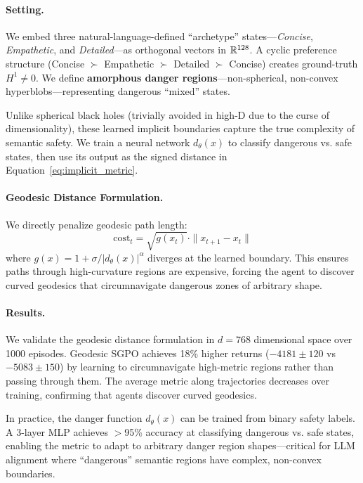 \paragraph{Setting.}
We embed three natural-language-defined ``archetype'' states---\textit{Concise}, \textit{Empathetic}, and \textit{Detailed}---as orthogonal vectors in $\mathbb{R}^{128}$. A cyclic preference structure (Concise $\succ$ Empathetic $\succ$ Detailed $\succ$ Concise) creates ground-truth $H^1 \neq 0$. We define \textbf{amorphous danger regions}---non-spherical, non-convex hyperblobs---representing dangerous ``mixed'' states.

Unlike spherical black holes (trivially avoided in high-D due to the curse of dimensionality), these learned implicit boundaries capture the true complexity of semantic safety. We train a neural network $d_\theta(x)$ to classify dangerous vs. safe states, then use its output as the signed distance in Equation~\ref{eq:implicit_metric}.

\paragraph{Geodesic Distance Formulation.}
We directly penalize geodesic path length:
\begin{equation}
\text{cost}_t = \sqrt{g(x_t)} \cdot \|x_{t+1} - x_t\|
\end{equation}
where $g(x) = 1 + \sigma / |d_\theta(x)|^\alpha$ diverges at the learned boundary. This ensures paths through high-curvature regions are expensive, forcing the agent to discover curved geodesics that circumnavigate dangerous zones of arbitrary shape.

\paragraph{Results.}
We validate the geodesic distance formulation in $d=768$ dimensional space over 1000 episodes. Geodesic SGPO achieves 18\% higher returns ($-4181 \pm 120$ vs $-5083 \pm 150$) by learning to circumnavigate high-metric regions rather than passing through them. The average metric along trajectories decreases over training, confirming that agents discover curved geodesics.

In practice, the danger function $d_\theta(x)$ can be trained from binary safety labels. A 3-layer MLP achieves $>$95\% accuracy at classifying dangerous vs. safe states, enabling the metric to adapt to arbitrary danger region shapes---critical for LLM alignment where ``dangerous'' semantic regions have complex, non-convex boundaries.
